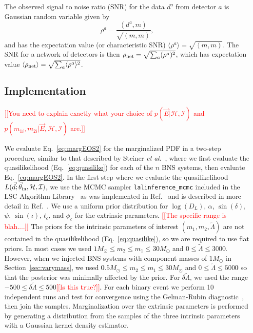 \documentclass[twocolumn,prd,amssymb,aps,nofootinbib,showpacs,epsf]{revtex4}
\newcommand{\red}{\textcolor{red}}
\begin{document}
The observed signal to noise ratio (SNR) for the data $d^a$ from detector $a$ is Gaussian random variable given by
\begin{equation}
\rho^a = \frac{(d^a, m)}{\sqrt{(m, m)}},
\end{equation}
and has the expectation value (or characteristic SNR) $\langle \rho^a \rangle = \sqrt{(m, m)}$. The SNR for a network of detectors is then $\rho_{\rm net} = \sqrt{\sum_a(\rho^a)^2}$, which has expectation value $\langle \rho_{\rm net} \rangle = \sqrt{\sum_a\langle \rho^a \rangle^2}$.

\subsection{Implementation}

\red{[[You need to explain exactly what your choice of $p(\vec E | \mathcal{H},\mathcal{I})$ and $ p(m_{1i}, m_{2i} | \vec E, \mathcal{H},\mathcal{I})$ are.]]}

We evaluate Eq.~\eqref{eq:margEOS2} for the marginalized PDF in a two-step procedure, similar to that described by Steiner {\it et al.}~\cite{SteinerLattimerBrown2010}, where we first evaluate the quasilikelihood (Eq.~\eqref{eq:quasilike}) for each of the $n$ BNS systems, then evaluate Eq.~\eqref{eq:margEOS2}. In the first step where we evaluate the quasilikelihood $L(\vec d; \vec\theta_{\rm in}, \mathcal{H}, \mathcal{I})$, we use the MCMC sampler \texttt{lalinference\_mcmc} included in the LSC Algorithm Library~\cite{lal} as was implemented in Ref.~\cite{WadeCreightonOchsner2014} and is described in more detail in Ref.~\cite{VanDerSluysRaymondMandel2008}. We use a uniform prior distribution for $\log(D_L)$, $\alpha$, $\sin(\delta)$, $\psi$, $\sin(\iota)$, $t_c$, and $\phi_c$ for the extrinsic parameters. \red{[[The specific range is blah....]]} The priors for the intrinsic parameters of interest $(m_{1}, m_{2}, \tilde\Lambda)$ are not contained in the quasilikelihood (Eq.~\eqref{eq:quasilike}), so we are required to use flat priors. In most cases we used $1M_\odot \le m_2 \le m_1 \le 30M_\odot$ and $0 \le \tilde\Lambda \le 3000$. However, when we injected BNS systems with component masses of $1M_\odot$ in Section~\ref{sec:varymass}, we used $0.5M_\odot \le m_2 \le m_1 \le 30M_\odot$ and $0 \le \tilde\Lambda \le 5000$ so that the posterior was minimally affected by the prior. For $\delta\tilde\Lambda$, we used the range $-500 \le \delta\tilde\Lambda \le 500$\red{[[Is this true?]]}. For each binary event we perform 10 independent runs and test for convergence using the Gelman-Rubin diagnostic~\cite{GelmanRubin1992}, then join the samples. Marginalization over the extrinsic parameters is performed by generating a distribution from the samples of the three intrinsic parameters with a Gaussian kernel density estimator. 
\end{document}
